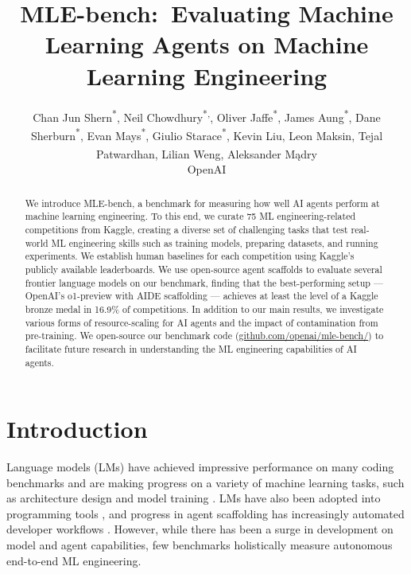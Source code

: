 \documentclass{article} %
\title{\centering MLE-bench:~Evaluating Machine Learning Agents on Machine Learning Engineering}
\author{
Chan Jun Shern\textsuperscript{*}, 
Neil Chowdhury\textsuperscript{*,\dag}, 
Oliver Jaffe\textsuperscript{*}, 
James Aung\textsuperscript{*}, 
Dane Sherburn\textsuperscript{*}, 
Evan Mays\textsuperscript{*},
Giulio Starace\textsuperscript{*}, 
Kevin Liu, 
Leon Maksin, 
Tejal Patwardhan, 
Lilian Weng\textsuperscript{\dag}, 
Aleksander M\k{a}dry
\\
OpenAI
}
\begin{document}
\maketitle

\begingroup
\renewcommand{\thefootnote}{\fnsymbol{footnote}}
\setcounter{footnote}{0}
\endgroup

\begin{abstract}
We introduce MLE-bench, a benchmark for measuring how well AI agents perform at machine learning engineering. To this end, we curate 75 ML engineering-related competitions from Kaggle, creating a diverse set of challenging tasks that test real-world ML engineering skills such as training models, preparing datasets, and running experiments. We establish human baselines for each competition using Kaggle's publicly available leaderboards. We use open-source agent scaffolds to evaluate several frontier language models on our benchmark, finding that the best-performing setup — OpenAI's o1-preview with AIDE scaffolding — achieves at least the level of a Kaggle bronze medal in 16.9\% of competitions. In addition to our main results, we investigate various forms of resource-scaling for AI agents and the impact of contamination from pre-training. We open-source our benchmark code (\href{https://github.com/openai/mle-bench/}{github.com/openai/mle-bench/}) to facilitate future research in understanding the ML engineering capabilities of AI agents.
\end{abstract}

\section{Introduction}
\label{sec:introduction}

Language models (LMs) have achieved impressive performance on many coding benchmarks \citep{chen_evaluating_2021, hendrycks_measuring_2021, austin_program_2021, li_competition-level_2022} and are making progress on a variety of machine learning tasks, such as architecture design and model training \citep{zheng_can_2023,huang_mlagentbench_2024}. LMs have also been adopted into programming tools \citep{kalliamvakou_research_2022}, and progress in agent scaffolding has increasingly automated developer workflows \citep{cognitionai_cognition_2024,dohmke_github_2024}. However, while there has been a surge in development on model and agent capabilities, few benchmarks holistically measure autonomous end-to-end ML engineering.
\end{document}
